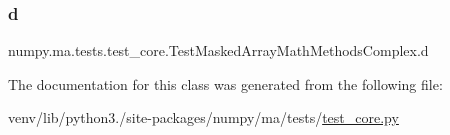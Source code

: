 \subsubsection{\texorpdfstring{d}{d}}
{\footnotesize\ttfamily numpy.\+ma.\+tests.\+test\+\_\+core.\+Test\+Masked\+Array\+Math\+Methods\+Complex.\+d}



The documentation for this class was generated from the following file\+:\begin{DoxyCompactItemize}
\item 
venv/lib/python3./site-\/packages/numpy/ma/tests/\hyperlink{numpy_2ma_2tests_2test__core_8py}{test\+\_\+core.\+py}\end{DoxyCompactItemize}
